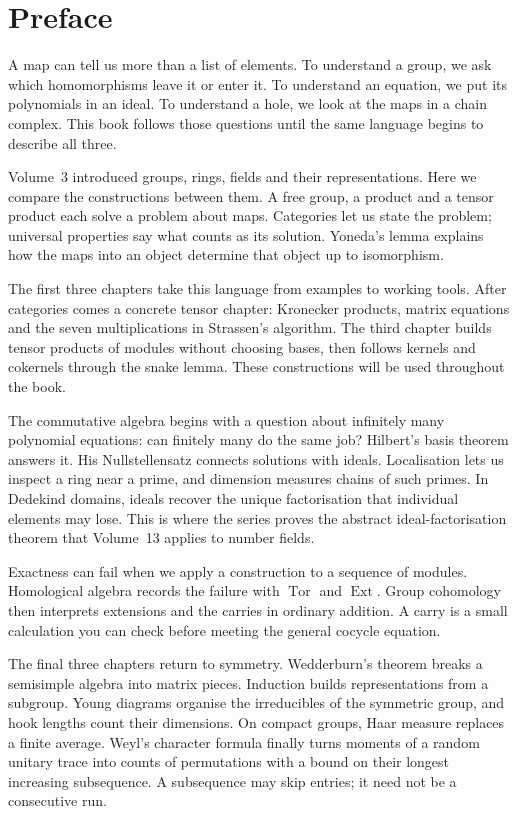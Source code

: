 \chapter*{Preface}

A map can tell us more than a list of elements. To understand a group, we ask which homomorphisms leave it or enter it. To understand an equation, we put its polynomials in an ideal. To understand a hole, we look at the maps in a chain complex. This book follows those questions until the same language begins to describe all three.

Volume~3 introduced groups, rings, fields and their representations. Here we compare the constructions between them. A free group, a product and a tensor product each solve a problem about maps. Categories let us state the problem; universal properties say what counts as its solution. Yoneda's lemma explains how the maps into an object determine that object up to isomorphism.

The first three chapters take this language from examples to working tools. After categories comes a concrete tensor chapter: Kronecker products, matrix equations and the seven multiplications in Strassen's algorithm. The third chapter builds tensor products of modules without choosing bases, then follows kernels and cokernels through the snake lemma. These constructions will be used throughout the book.

The commutative algebra begins with a question about infinitely many polynomial equations: can finitely many do the same job? Hilbert's basis theorem answers it. His Nullstellensatz connects solutions with ideals. Localisation lets us inspect a ring near a prime, and dimension measures chains of such primes. In Dedekind domains, ideals recover the unique factorisation that individual elements may lose. This is where the series proves the abstract ideal-factorisation theorem that Volume~13 applies to number fields.

Exactness can fail when we apply a construction to a sequence of modules. Homological algebra records the failure with $\operatorname{Tor}$ and $\operatorname{Ext}$. Group cohomology then interprets extensions and the carries in ordinary addition. A carry is a small calculation you can check before meeting the general cocycle equation.

The final three chapters return to symmetry. Wedderburn's theorem breaks a semisimple algebra into matrix pieces. Induction builds representations from a subgroup. Young diagrams organise the irreducibles of the symmetric group, and hook lengths count their dimensions. On compact groups, Haar measure replaces a finite average. Weyl's character formula finally turns moments of a random unitary trace into counts of permutations with a bound on their longest increasing subsequence. A subsequence may skip entries; it need not be a consecutive run.

